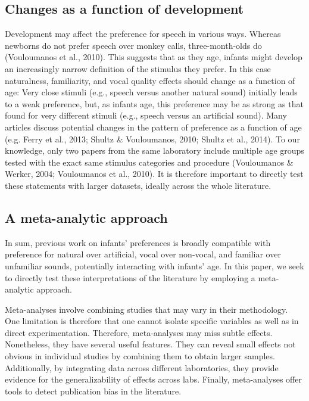 \documentclass[man]{apa6}
\begin{document}
\subsection{Changes as a function of
development}\label{changes-as-a-function-of-development}

Development may affect the preference for speech in various ways.
Whereas newborns do not prefer speech over monkey calls,
three-month-olds do (Vouloumanos et al., 2010). This suggests that as
they age, infants might develop an increasingly narrow definition of the
stimulus they prefer. In this case naturalness, familiarity, and vocal
quality effects should change as a function of age: Very close stimuli
(e.g., speech versus another natural sound) initially leads to a weak
preference, but, as infants age, this preference may be as strong as
that found for very different stimuli (e.g., speech versus an artificial
sound). Many articles discuss potential changes in the pattern of
preference as a function of age (e.g. Ferry et al., 2013; Shultz \&
Vouloumanos, 2010; Shultz et al., 2014). To our knowledge, only two
papers from the same laboratory include multiple age groups tested with
the exact same stimulus categories and procedure (Vouloumanos \& Werker,
2004; Vouloumanos et al., 2010). It is therefore important to directly
test these statements with larger datasets, ideally across the whole
literature.

\subsection{A meta-analytic approach}\label{a-meta-analytic-approach}

In sum, previous work on infants' preferences is broadly compatible with
preference for natural over artificial, vocal over non-vocal, and
familiar over unfamiliar sounds, potentially interacting with infants'
age. In this paper, we seek to directly test these interpretations of
the literature by employing a meta-analytic approach.

Meta-analyses involve combining studies that may vary in their
methodology. One limitation is therefore that one cannot isolate
specific variables as well as in direct experimentation. Therefore,
meta-analyses may miss subtle effects. Nonetheless, they have several
useful features. They can reveal small effects not obvious in individual
studies by combining them to obtain larger samples. Additionally, by
integrating data across different laboratories, they provide evidence
for the generalizability of effects across labs. Finally, meta-analyses
offer tools to detect publication bias in the literature.
\end{document}
